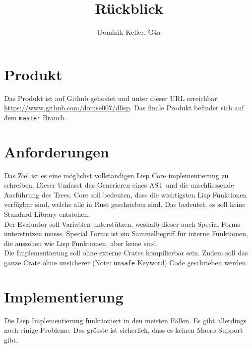 \documentclass[11pt]{article}
\author{Dominik Keller, G4a}
\date{}
\title{Rückblick}
\begin{document}
\maketitle

\section{Produkt}
\label{sec:orgfc212af}
Das Produkt ist auf Github gehostet und unter dieser URL erreichbar:
\href{https://www.github.com/domse007/dlisp}{https://www.github.com/domse007/dlisp}. Das finale Produkt befindet
sich auf dem \texttt{master} Branch.

\section{Anforderungen}
\label{sec:org97351aa}
\noindent
Das Ziel ist es eine möglichst vollständigen Lisp Core implementierung zu schreiben. Dieser Umfasst das Generieren eines AST und die anschliessende Ausführung des Trees. Core soll bedeuten, dass die wichtigsten Lisp Funktionen verfügbar sind, welche alle in Rust geschrieben sind. Das bedeutet, es soll keine Standard Library entstehen.\\

\noindent
Der Evaluator soll Variablen unterstützen, weshalb dieser auch Special Forms unterstützen musss. Special Forms ist ein Sammelbegriff für interne Funktionen, die aussehen wie Lisp Funktionen, aber keine sind.\\

\noindent
Die Implementierung soll ohne externe Crates kompilierbar sein. Zudem soll das ganze Crate ohne unsicherer (Note: \texttt{unsafe} Keyword) Code geschrieben werden.

\section{Implementierung}
\label{sec:orgbc15bbc}
\noindent
Die Lisp Implementierung funktioniert in den meisten Fällen. Es gibt
allerdings noch einige Probleme. Das grösste ist sicherlich, dass es
keinen Macro Support gibt.
\end{document}
